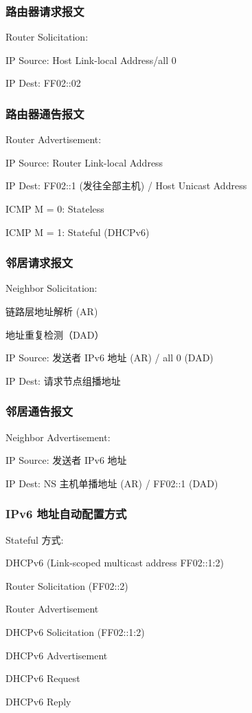 \documentclass[UTF8,cs4size]{ctexart}
\begin{document}
\subsubsection{路由器请求报文}
Router Solicitation:
\begin{compactitem}
  \item IP Source: Host Link-local Address/all 0
  \item IP Dest: FF02::02
\end{compactitem}
\subsubsection{路由器通告报文}
Router Advertisement:
\begin{compactitem}
  \item IP Source: Router Link-local Address
  \item IP Dest: FF02::1 (发往全部主机) / Host Unicast Address
  \item ICMP M = 0: Stateless
  \item ICMP M = 1: Stateful (DHCPv6)
\end{compactitem}
\subsubsection{邻居请求报文}
Neighbor Solicitation:
\begin{compactitem}
  \item 链路层地址解析 (AR)
  \item 地址重复检测（DAD）
  \item IP Source: 发送者 IPv6 地址 (AR) / all 0 (DAD)
  \item IP Dest: 请求节点组播地址
\end{compactitem}
\subsubsection{邻居通告报文}
Neighbor Advertisement:
\begin{compactitem}
  \item IP Source: 发送者 IPv6 地址
  \item IP Dest: NS 主机单播地址 (AR) / FF02::1 (DAD)
\end{compactitem}
\subsubsection{IPv6 地址自动配置方式}
Stateful 方式:
\begin{compactitem}
  \item DHCPv6 (Link-scoped multicast address FF02::1:2)
  \item Router Solicitation (FF02::2)
  \item Router Advertisement
  \item DHCPv6 Solicitation (FF02::1:2)
  \item DHCPv6 Advertisement
  \item DHCPv6 Request
  \item DHCPv6 Reply
\end{compactitem}
\end{document}
